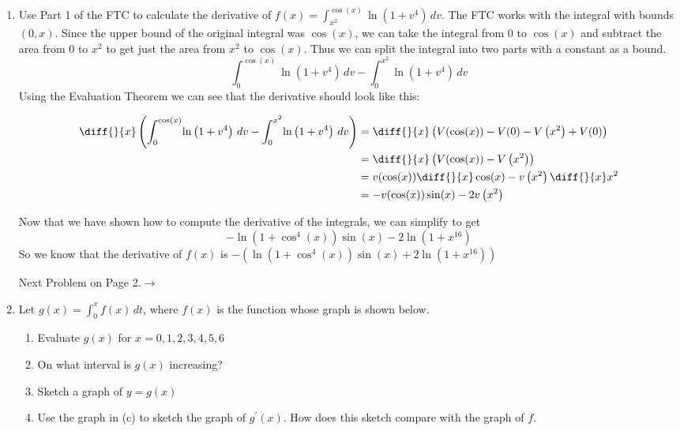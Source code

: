 \documentclass{article}
\begin{document}
\begin{enumerate}[label=\textbf{(2.\arabic*)}] %

\item Use Part 1 of the FTC to calculate the derivative of $f(x)=\displaystyle{ \int_{x^2}^{\cos(x)}\!\ln\left(1+v^4\right)\,dv }$.
\newline
The FTC works with the integral with bounds $(0,x)$. Since the upper bound of the original integral was $\cos(x)$, we can take the integral from 0 to $\cos(x)$ and subtract the area from 0 to $x^2$ to get just the area from $x^2$ to $\cos(x)$. Thus we can split the integral into two parts with a constant as a bound.
\[\int_0^{\cos(x)}\!\ln\left(1+v^4\right)\,dv-\int_0^{x^2}\!\ln\left(1+v^4\right)\,dv\]
Using the Evaluation Theorem we can see that the derivative should look like this:

\begin{align*}
\diff{}{x}\left(\int_0^{\cos(x)}\!\ln\left(1+v^4\right)\,dv-\int_0^{x^2}\!\ln\left(1+v^4\right)\,dv\right) &= \diff{}{x}\left(V(\cos(x))-V(0)-V\left(x^2\right)+V(0)\right) \\
&=\diff{}{x}\left(V(\cos(x))-V\left(x^2\right)\right) \\
&=v(\cos(x))\diff{}{x}\cos(x)-v\left(x^2\right)\diff{}{x}x^2 \\
&= -v(\cos(x))\sin(x)-2v\left(x^2\right)
\end{align*}

Now that we have shown how to compute the derivative of the integrals, we can simplify to get
\[-\ln\left(1+\cos^4(x)\right)\sin(x)-2\ln\left(1+x^16\right)\]
So we know that the derivative of $f(x)$ is $-\left(\ln\left(1+\cos^4(x)\right)\sin(x)+2\ln\left(1+x^16\right)\right)$ \\
\newline

\begin{center}
Next Problem on Page 2.$ \rightarrow$
\end{center}

\newpage %

\item Let $g(x)= \displaystyle{ \int_0^x\! f(x) \, dt }$, where $f(x)$ is the function whose graph is shown below.

\begin{enumerate}[label=(\alph*)]
\item Evaluate $g(x)$ for $x=0,1,2,3,4,5,6$
\item On what interval is $g(x)$ increasing?
\item Sketch a graph of $y=g(x)$
\item Use the graph in (c) to sketch the graph of $g^\prime(x)$. How does this sketch compare with the graph of $f$.
\end{enumerate}


\end{enumerate}
\end{document}
